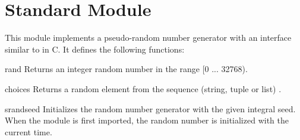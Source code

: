 \section{Standard Module }

 This module implements a pseudo-random number
generator with an interface similar to  in C\@.  It defines
the following functions:

\renewcommand{\indexsubitem}{(in module rand)}
\begin{funcdesc}{rand}{}
Returns an integer random number in the range [0 ... 32768).
\end{funcdesc}

\begin{funcdesc}{choice}{s}
Returns a random element from the sequence (string, tuple or list)
.
\end{funcdesc}

\begin{funcdesc}{srand}{seed}
Initializes the random number generator with the given integral seed.
When the module is first imported, the random number is initialized with
the current time.
\end{funcdesc}
